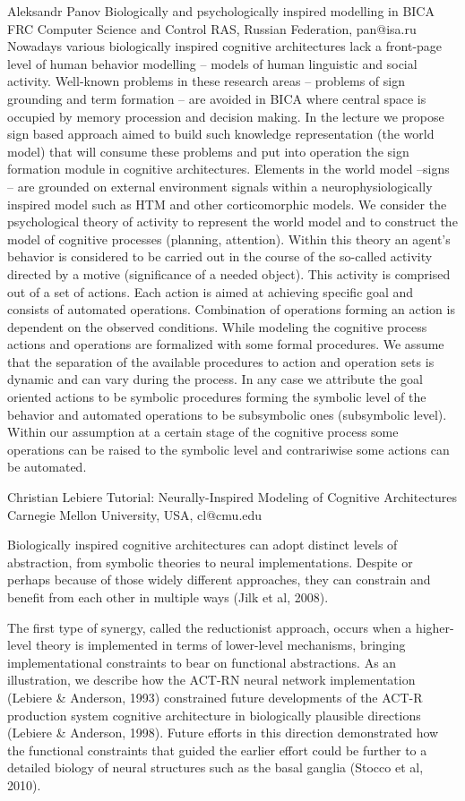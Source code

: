 \documentclass[10pt,fleqn,openany]{book} %
\begin{document}
\begin{enumerate}
	\paperabstract
		{Aleksandr Panov}
		{Biologically and psychologically inspired modelling in BICA}	
		{FRC Computer Science and Control RAS, Russian Federation, pan@isa.ru}
		{Nowadays various biologically inspired cognitive architectures lack a front-page level of human behavior modelling – models of human linguistic and social activity. Well-known problems in these research areas – problems of sign grounding and term formation – are avoided in BICA where central space is occupied by memory procession and decision making. In the lecture we propose sign based approach aimed to build such knowledge representation (the world model) that will consume these problems and put into operation the sign formation module in cognitive architectures. Elements in the world model –signs – are grounded on external environment signals within a neurophysiologically inspired model such as HTM and other corticomorphic models. We consider the psychological theory of activity to represent the world model and to construct the model of cognitive processes (planning, attention). Within this theory an agent’s behavior is considered to be carried out in the course of the so-called activity directed by a motive (significance of a needed object). This activity is comprised out of a set of actions. Each action is aimed at achieving specific goal and consists of automated operations. Combination of operations forming an action is dependent on the observed conditions. While modeling the cognitive process actions and operations are formalized with some formal procedures. We assume that the separation of the available procedures to action and operation sets is dynamic and can vary during the process. In any case we attribute the goal oriented actions to be symbolic procedures forming the symbolic level of the behavior and automated operations to be subsymbolic ones (subsymbolic level). Within our assumption at a certain stage of the cognitive process some operations can be raised to the symbolic level and contrariwise some actions can be automated.}
		
	\paperabstract
		{Christian Lebiere}
		{Tutorial: Neurally-Inspired Modeling of Cognitive Architectures}
		{Carnegie Mellon University, USA, cl@cmu.edu}
		{Biologically inspired cognitive architectures can adopt distinct levels of
			abstraction, from symbolic theories to neural implementations.  Despite or
			perhaps because of those widely different approaches, they can constrain and
			benefit from each other in multiple ways (Jilk et al, 2008).
			
			The first type of synergy, called the reductionist approach, occurs when a
			higher-level theory is implemented in terms of lower-level mechanisms,
			bringing implementational constraints to bear on functional abstractions.
			As an illustration, we describe how the ACT-RN neural network implementation
			(Lebiere \& Anderson, 1993) constrained future developments of the ACT-R
			production system cognitive architecture in biologically plausible
			directions (Lebiere \& Anderson, 1998).  Future efforts in this direction
			demonstrated how the functional constraints that guided the earlier effort
			could be further to a detailed biology of neural structures such as the
			basal ganglia (Stocco et al, 2010).
			
}
\end{enumerate}
\end{document}
